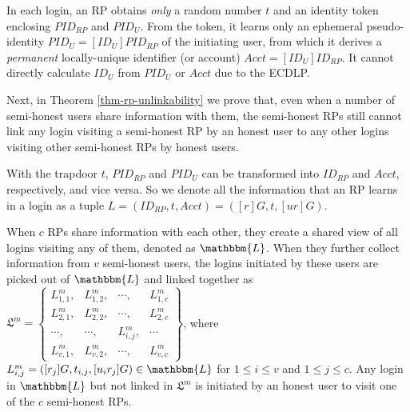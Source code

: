 In each login, an RP obtains \emph{only} a random number $t$ and an identity token enclosing $PID_{RP}$ and $PID_U$. From the token, it learns only an ephemeral pseudo-identity $PID_{U} = [{ID_U}]{PID_{RP}}$ of the initiating user, from which it derives a \emph{permanent} locally-unique identifier (or account) $Acct = [ID_U]ID_{RP}$.
It cannot directly calculate $ID_U$ from $PID_{U}$ or $Acct$ due to the ECDLP.

Next, in Theorem \ref{thm-rp-unlinkability} we prove that, 
even when a number of semi-honest users share information with them,
the semi-honest RPs still cannot link any login visiting a semi-honest RP by an honest user to any other logins visiting other semi-honest RPs by honest users.


With the trapdoor $t$, $PID_{RP}$ and $PID_U$ can be transformed into $ID_{RP}$ and $Acct$, respectively, and vice versa.
So we denote all the information that an RP learns in a login as a tuple $L =(ID_{RP}, t, Acct)=([r]G, t, [ur]G)$.

When $c$ RPs share information with each other, they create a shared view of all logins visiting any of them, denoted as $\mathbbm{L}$.
When they further collect information from $v$ semi-honest users, the logins initiated by these users are picked out of $\mathbbm{L}$ and linked together as
$\mathfrak{L}^m=\left \{ \begin{matrix}
L^m_{1,1},&L^m_{1,2},&\cdots,&L^m_{1,c}\\
L^m_{2,1},& L^m_{2,2},&\cdots,&L^m_{2,c}\\
\cdots,&\cdots,&L^m_{i,j},&\cdots\\
L^m_{v,1},&L^m_{v,2},&\cdots,&L^m_{v,c}
\end{matrix}\right\}$,
where $L^m_{i, j}=([r_j]G, t_{i,j}, [u_ir_j]G) \in \mathbbm{L}$ for $1 \le i \le v$ and $1 \le j \le c$. Any login in $\mathbbm{L}$ but not linked in $\mathfrak{L}^m$ is initiated by an honest user to visit one of the $c$ semi-honest RPs.

